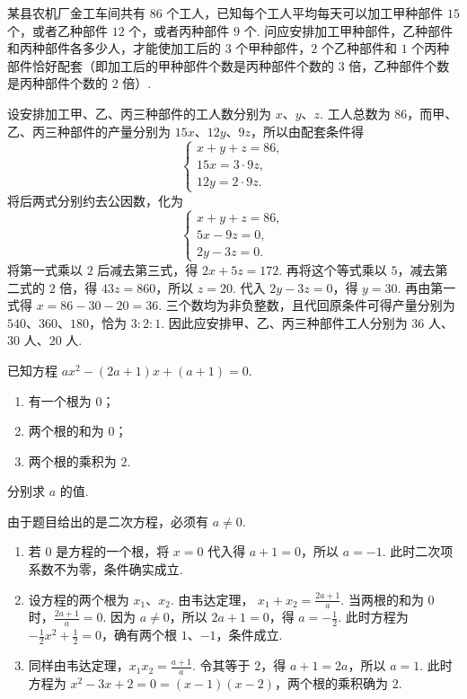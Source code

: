 \begin{problem}
某县农机厂金工车间共有 \(86\) 个工人，已知每个工人平均每天可以加工甲种部件 \(15\) 个，或者乙种部件 \(12\) 个，或者丙种部件 \(9\) 个. 问应安排加工甲种部件，乙种部件和丙种部件各多少人，才能使加工后的 \(3\) 个甲种部件，\(2\) 个乙种部件和 \(1\) 个丙种部件恰好配套（即加工后的甲种部件个数是丙种部件个数的 \(3\) 倍，乙种部件个数是丙种部件个数的 \(2\) 倍）.
\end{problem}

\begin{solution}
设安排加工甲、乙、丙三种部件的工人数分别为 \(x\)、\(y\)、\(z\). 工人总数为 \(86\)，而甲、乙、丙三种部件的产量分别为 \(15x\)、\(12y\)、\(9z\)，所以由配套条件得
\[
\begin{cases}
x+y+z=86,\\
15x=3\cdot9z,\\
12y=2\cdot9z.
\end{cases}
\]
将后两式分别约去公因数，化为
\[
\begin{cases}
x+y+z=86,\\
5x-9z=0,\\
2y-3z=0.
\end{cases}
\]
将第一式乘以 \(2\) 后减去第三式，得 \(2x+5z=172\). 再将这个等式乘以 \(5\)，减去第二式的 \(2\) 倍，得
\(43z=860\)，所以 \(z=20\). 代入 \(2y-3z=0\)，得 \(y=30\). 再由第一式得 \(x=86-30-20=36\). 三个数均为非负整数，且代回原条件可得产量分别为 \(540\)、\(360\)、\(180\)，恰为 \(3:2:1\). 因此应安排甲、乙、丙三种部件工人分别为 \(36\) 人、\(30\) 人、\(20\) 人.
\end{solution}

\begin{problem}
已知方程 \(ax^2-(2a+1)x+(a+1)=0\).
\begin{enumerate}
    \item 有一个根为 \(0\)；
    \item 两个根的和为 \(0\)；
    \item 两个根的乘积为 \(2\).
\end{enumerate}
分别求 \(a\) 的值.
\end{problem}

\begin{solution}
由于题目给出的是二次方程，必须有 \(a\ne0\).
\begin{enumerate}
\item 若 \(0\) 是方程的一个根，将 \(x=0\) 代入得 \(a+1=0\)，所以 \(a=-1\). 此时二次项系数不为零，条件确实成立.

\item 设方程的两个根为 \(x_1\)、\(x_2\). 由韦达定理，
\(x_1+x_2=\frac{2a+1}{a}\). 当两根的和为 \(0\) 时，\(\frac{2a+1}{a}=0\). 因为 \(a\ne0\)，所以 \(2a+1=0\)，得 \(a=-\frac12\). 此时方程为 \(-\frac12x^2+\frac12=0\)，确有两个根 \(1\)、\(-1\)，条件成立.

\item 同样由韦达定理，\(x_1x_2=\frac{a+1}{a}\). 令其等于 \(2\)，得 \(a+1=2a\)，所以 \(a=1\). 此时方程为 \(x^2-3x+2=0=(x-1)(x-2)\)，两个根的乘积确为 \(2\).
\end{enumerate}
\end{solution}

